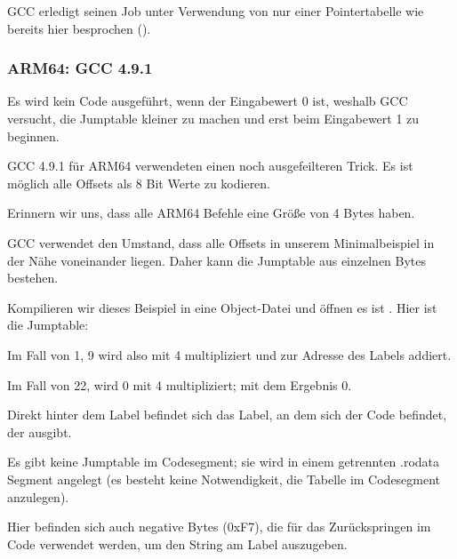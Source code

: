 GCC erledigt seinen Job unter Verwendung von nur einer Pointertabelle wie bereits hier besprochen
().

\subsubsection{ARM64: \Optimizing GCC 4.9.1}
Es wird kein Code ausgeführt, wenn der Eingabewert 0 ist, weshalb GCC versucht, die Jumptable kleiner zu machen und erst
beim Eingabewert 1 zu beginnen.

GCC 4.9.1 für ARM64 verwendeten einen noch ausgefeilteren Trick.
Es ist möglich alle Offsets als 8 Bit Werte zu kodieren.

Erinnern wir uns, dass alle ARM64 Befehle eine Größe von 4 Bytes haben.

GCC verwendet den Umstand, dass alle Offsets in unserem Minimalbeispiel in der Nähe voneinander liegen. Daher kann die
Jumptable aus einzelnen Bytes bestehen.


Kompilieren wir dieses Beispiel in eine Object-Datei und öffnen es ist \IDA. Hier ist die Jumptable:



Im Fall von 1, 9 wird also mit 4 multipliziert und zur Adresse des Labels  addiert.

Im Fall von 22, wird 0 mit 4 multipliziert; mit dem Ergebnis 0. 

Direkt hinter dem  Label befindet sich das  Label, an dem sich der Code befindet, der  ausgibt.

Es gibt keine Jumptable im Codesegment; sie wird in einem getrennten .rodata Segment angelegt (es besteht keine
Notwendigkeit, die Tabelle im Codesegment anzulegen).

Hier befinden sich auch negative Bytes (0xF7), die für das Zurückspringen im Code verwendet werden, um den 
String am Label  auszugeben.

